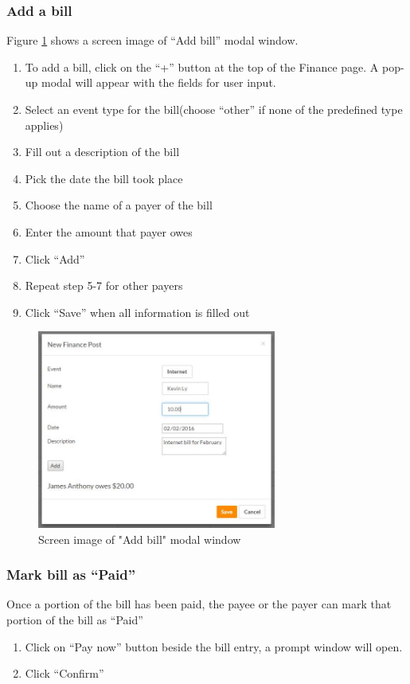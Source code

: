 \documentclass[12pt]{article}
\begin{document}
    \subsubsection{Add a bill}
    Figure \ref{fig:addBill} shows a screen image of ``Add bill'' modal window.
    \begin{enumerate}
        \item To add a bill, click on the ``+'' button at the top of the Finance page. A pop-up modal will appear with the fields for user input.
        \item Select an event type for the bill(choose ``other'' if none of the predefined type applies)
        \item Fill out a description of the bill
        \item Pick the date the bill took place
        \item Choose the name of a payer of the bill
        \item Enter the amount that payer owes
        \item Click ``Add''
        \item Repeat step 5-7 for other payers
        \item Click ``Save'' when all information is filled out
    \end{enumerate}

    \begin{figure}
        \centering
        \includegraphics[width=0.7\textwidth]{addBill}
        \caption{Screen image of "Add bill" modal window}
        \label{fig:addBill}
    \end{figure}

    \subsubsection{Mark bill as ``Paid''}
    Once a portion of the bill has been paid, the payee or the payer can mark that portion of the bill as ``Paid''
    \begin{enumerate}
        \item Click on ``Pay now'' button beside the bill entry, a prompt window will open.
        \item Click ``Confirm''
    \end{enumerate}
\end{document}
